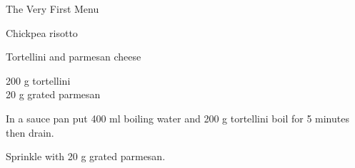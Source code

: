 \begin{menu}{The Very First Menu}
\begin{recipe}{2}{Chickpea risotto}
\begin{instructions}
    \end{instructions}
    \end{recipe}%
  
    \begin{recipe}{1}{Tortellini and parmesan cheese}%
    
		\begin{ingredients}
		200 g tortellini  \\
	20 g grated parmesan  \\
	
		\end{ingredients}
	
    \begin{instructions}
    \item 
      In a
      sauce pan
      put
      400 ml  boiling water
      and
      200 g  tortellini
      boil for 5 minutes then drain.
    \item 
        Sprinkle with
        20 g  grated parmesan.
      
    \end{instructions}
    \end{recipe}%
  
    \clearpage
    \end{menu}
	
